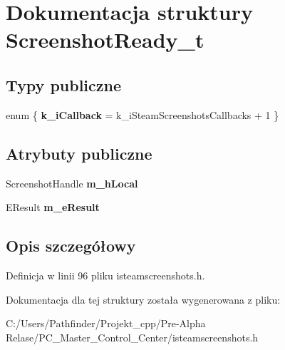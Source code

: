 \hypertarget{struct_screenshot_ready__t}{}\section{Dokumentacja struktury Screenshot\+Ready\+\_\+t}
\label{struct_screenshot_ready__t}
\subsection*{Typy publiczne}
\begin{DoxyCompactItemize}
\item 
\mbox{\label{struct_screenshot_ready__t_a7ebbea7d0e58ba2b3c103e0abc29fa72}} 
enum \{ {\bfseries k\+\_\+i\+Callback} = k\+\_\+i\+Steam\+Screenshots\+Callbacks + 1
 \}
\end{DoxyCompactItemize}
\subsection*{Atrybuty publiczne}
\begin{DoxyCompactItemize}
\item 
\mbox{\label{struct_screenshot_ready__t_ace698ada4845a52633393ca4a205955d}} 
Screenshot\+Handle {\bfseries m\+\_\+h\+Local}
\item 
\mbox{\label{struct_screenshot_ready__t_a583be73916a44455c4d234dd53805401}} 
E\+Result {\bfseries m\+\_\+e\+Result}
\end{DoxyCompactItemize}


\subsection{Opis szczegółowy}


Definicja w linii 96 pliku isteamscreenshots.\+h.



Dokumentacja dla tej struktury została wygenerowana z pliku\+:\begin{DoxyCompactItemize}
\item 
C\+:/\+Users/\+Pathfinder/\+Projekt\+\_\+cpp/\+Pre-\/\+Alpha Relase/\+P\+C\+\_\+\+Master\+\_\+\+Control\+\_\+\+Center/isteamscreenshots.\+h\end{DoxyCompactItemize}
